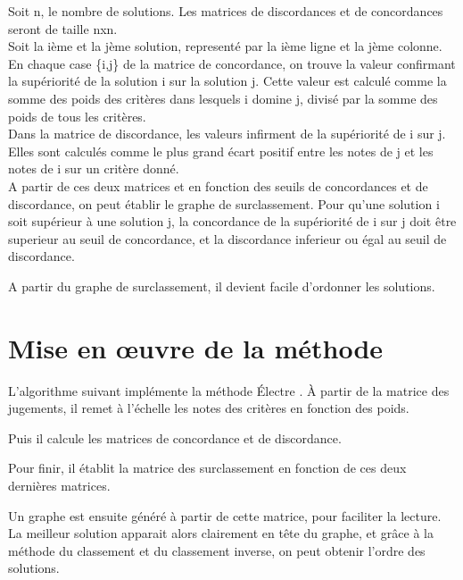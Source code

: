 Soit n, le nombre de solutions.
Les matrices de discordances et de concordances seront de taille nxn.\\

Soit la ième et la jème solution, representé par la ième ligne et la jème colonne.\\
En chaque case \{i,j\} de la matrice de concordance, on trouve la valeur confirmant la supériorité de la solution i sur la solution j. Cette valeur est calculé comme la somme des poids des critères dans lesquels i domine j, divisé par la somme des poids de tous les critères.\\
Dans la matrice de discordance, les valeurs infirment de la supériorité de i sur j. Elles sont calculés comme le plus grand écart positif entre les notes de j et les notes de i sur un critère donné.\\

A partir de ces deux matrices et en fonction des seuils de concordances et de discordance, on peut établir le graphe de surclassement.
Pour qu'une solution i soit supérieur à une solution j, la concordance de la supériorité de i sur j doit être superieur au seuil de concordance, et la discordance inferieur ou égal au seuil de discordance.

A partir du graphe de surclassement, il devient facile d'ordonner les solutions.

\section{Mise en œuvre de la méthode}
L'algorithme suivant implémente la méthode Électre . À partir de la matrice des jugements, il remet à l'échelle les notes des critères en fonction des poids.


Puis il calcule les matrices de concordance et de discordance.



Pour finir, il établit la matrice des surclassement en fonction de ces deux dernières matrices.


Un graphe est ensuite généré à partir de cette matrice, pour faciliter la lecture.
La meilleur solution apparait alors clairement en tête du graphe, et grâce à la méthode du classement et du classement inverse, on peut obtenir l'ordre des solutions.

